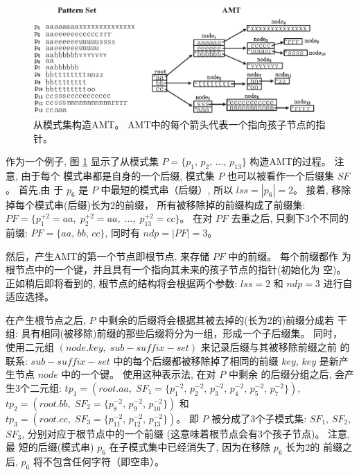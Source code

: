 \begin{figure}[!h]
  \centering
  \includegraphics[width=\textwidth]{figures/2_MPM/AMT}
  \caption{从模式集构造AMT。 AMT中的每个箭头代表一个指向孩子节点的指针。}
  \label{fig:AMT}
\end{figure}

作为一个例子, 图 \ref{fig:AMT} 显示了从模式集
$P = \{p_1,\, p_2,\, \dots,\, p_{13}\}$ 构造AMT的过程。 注意, 由于每个
模式串都是自身的一个后缀, 模式集 $P$ 也可以被看作一个后缀集 $SF$。 首先,由
于 $p_6$ 是 $P$ 中最短的模式串（后缀）, 所以 $lss = |p_6| = 2$。 接着,
移除掉每个模式串(后缀)长为2的前缀， 所有被移除掉的前缀构成了前缀集:
$PF = \{p_1^{+2} = aa,\; p_2^{+2} = aa,\; \dots,\; p_{13}^{+2} =
cc\}$。  在对 $PF$ 去重之后, 只剩下3个不同的前缀: $PF = \{aa,\, bb,\,
cc\}$, 同时有 $ndp = |PF| = 3$。

然后，产生AMT的第一个节点即根节点, 来存储 $PF$ 中的前缀。 每个前缀都作
为根节点中的一个键，并且具有一个指向其未来的孩子节点的指针(初始化为
空)。 正如稍后即将看到的, 根节点的结构将会根据两个参数:
$lss=2$ 和 $ndp=3$ 进行自适应选择。

在产生根节点之后, $P$ 中剩余的后缀将会根据其被去掉的(长为2的)前缀分成若
干组: 具有相同(被移除)前缀的那些后缀将分为一组，形成一个子后缀集。 同时，
使用二元组 $(node.key,\; sub-suffix-set)$ 来记录后缀与其被移除前缀之前
的联系: $sub-suffix-set$ 中的每个后缀都被移除掉了相同的前缀 $key$,
$key$ 是新产生节点 $node$ 中的一个键。 使用这种表示法, 在对 $P$ 中剩余
的后缀分组之后, 会产生3个二元组:
$tp_1 = (root.aa,\; SF_1=\{p_1^{-2},\, p_2^{-2},\, p_3^{-2},\,
p_4^{-2},\, p_5^{-2},\, p_7^{-2}\})$,\,
$tp_2 = (root.bb,\; SF_2=\{p_8^{-2},\, p_9^{-2},\,
p_{10}^{-2}\})$
和$tp_3 = (root.cc,\; SF_3=\{p_{11}^{-2},\, p_{12}^{-2},\,
p_{13}^{-2}\})$。 即 $P$ 被分成了3个子模式集: $SF_1$, $SF_2$, $SF_3$,
分别对应于根节点中的一个前缀 (这意味着根节点会有3个孩子节点)。 注意, 最
短的后缀(模式串) $p_6$ 在子模式集中已经消失了, 因为在移除 $p_6$ 长为2的
前缀之后, $p_6$ 将不包含任何字符（即空串）。

